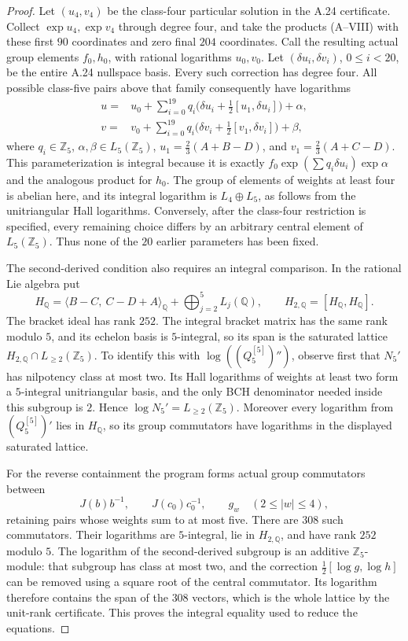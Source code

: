 \begin{proof}
Let $(u_4,v_4)$ be the class-four particular solution in
the A.24 certificate. Collect $\exp u_4,\exp v_4$ through
degree four, and take the products (A--VIII) with these
first $90$ coordinates and zero final $204$ coordinates.
Call the resulting actual group elements $f_0,h_0$, with
rational logarithms $u_0,v_0$.
Let $(\delta u_i,\delta v_i)$, $0\leq i<20$, be the
entire A.24 nullspace basis. Every such correction has
degree four. All possible class-five pairs above that
family consequently have logarithms
\[
\begin{aligned}
 u={}&u_0+\sum_{i=0}^{19}q_i
       \bigl(\delta u_i+\tfrac12[u_1,\delta u_i]\bigr)+\alpha,\\
 v={}&v_0+\sum_{i=0}^{19}q_i
       \bigl(\delta v_i+\tfrac12[v_1,\delta v_i]\bigr)+\beta,
\end{aligned}                                                   \tag{A--IX}
\]
where $q_i\in\mathbb Z_5$, $\alpha,\beta\in L_5(\mathbb Z_5)$,
$u_1=\frac23(A+B-D)$, and $v_1=\frac23(A+C-D)$.
This parameterization is integral because it is exactly
$f_0\exp(\sum q_i\delta u_i)\exp\alpha$ and the analogous
product for $h_0$. The group of elements of weights at
least four is abelian here, and its integral logarithm
is $L_4\oplus L_5$, as follows from the unitriangular
Hall logarithms. Conversely, after the class-four
restriction is specified, every remaining choice differs
by an arbitrary central element of $L_5(\mathbb Z_5)$.
Thus none of the $20$ earlier parameters has been fixed.

The second-derived condition also requires an integral
comparison. In the rational Lie algebra put
\[
 H_{\mathbb Q}=\langle B-C,\ C-D+A\rangle_{\mathbb Q}
                      +\bigoplus_{j=2}^5L_j(\mathbb Q),
 \qquad H_{2,\mathbb Q}=[H_{\mathbb Q},H_{\mathbb Q}].
\]
The bracket ideal has rank $252$. The integral bracket
matrix has the same rank modulo $5$, and its echelon
basis is $5$-integral, so its span is the saturated lattice
$H_{2,\mathbb Q}\cap L_{\geq2}(\mathbb Z_5)$.
To identify this with $\log((Q_5^{[5]})'')$, observe first
that $N_5'$ has nilpotency class at most two. Its Hall
logarithms of weights at least two form a $5$-integral
unitriangular basis, and the only BCH denominator needed
inside this subgroup is $2$. Hence
$\log N_5'=L_{\geq2}(\mathbb Z_5)$.
Moreover every logarithm from $(Q_5^{[5]})'$ lies in
$H_{\mathbb Q}$, so its group commutators have logarithms
in the displayed saturated lattice.

For the reverse containment the program forms actual
group commutators between
\[
 J(b)b^{-1},\qquad J(c_0)c_0^{-1},\qquad
          g_w\quad(2\leq|w|\leq4),
\]
retaining pairs whose weights sum to at most five.
There are $308$ such commutators. Their logarithms are
$5$-integral, lie in $H_{2,\mathbb Q}$, and have rank $252$
modulo $5$. The logarithm of the second-derived subgroup
is an additive $\mathbb Z_5$-module: that subgroup has
class at most two, and the correction
$\frac12[\log g,\log h]$ can be removed using a square
root of the central commutator. Its logarithm therefore
contains the span of the $308$ vectors, which is the
whole lattice by the unit-rank certificate. This proves
the integral equality used to reduce the equations.


\end{proof}

